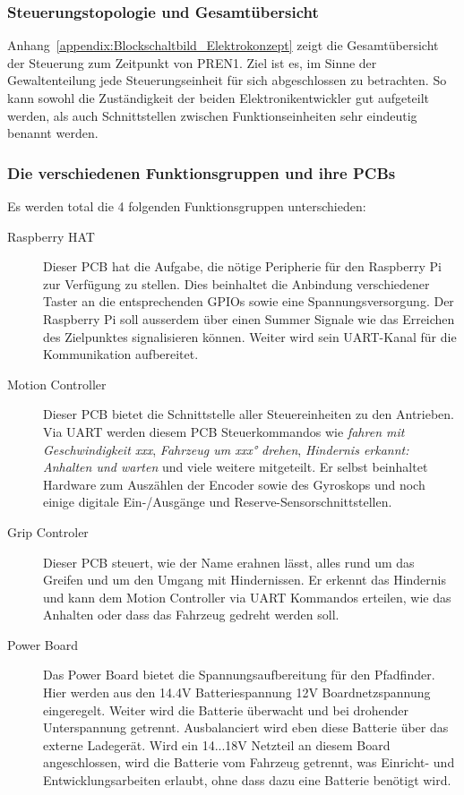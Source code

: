 \documentclass[main.tex]{subfiles} %
\begin{document}

\subsubsection{Steuerungstopologie und Gesamtübersicht}

Anhang~\ref{appendix:Blockschaltbild_Elektrokonzept} zeigt die Gesamtübersicht
der Steuerung zum Zeitpunkt von PREN1. Ziel ist es, im Sinne der
Gewaltenteilung jede Steuerungseinheit für sich abgeschlossen zu betrachten. So
kann sowohl die Zuständigkeit der beiden Elektronikentwickler gut aufgeteilt
werden, als auch Schnittstellen zwischen Funktionseinheiten sehr eindeutig
benannt werden.

\subsubsection*{Die verschiedenen Funktionsgruppen und ihre PCBs}
Es werden total die 4 folgenden Funktionsgruppen unterschieden:

\begin{description}
      \item[Raspberry HAT] Dieser PCB hat die Aufgabe, die nötige Peripherie für den
            Raspberry Pi zur Verfügung zu stellen. Dies beinhaltet die Anbindung
            verschiedener Taster an die entsprechenden GPIOs sowie eine
            Spannungsversorgung. Der Raspberry Pi soll ausserdem über einen Summer Signale
            wie das Erreichen des Zielpunktes signalisieren können. Weiter wird sein
            UART-Kanal für die Kommunikation aufbereitet.
      \item[Motion Controller] Dieser PCB bietet die Schnittstelle aller Steuereinheiten zu
            den Antrieben. Via UART werden diesem PCB Steuerkommandos wie \textit{fahren
                  mit Geschwindigkeit xxx}, \textit{Fahrzeug um xxx° drehen}, \textit{Hindernis
                  erkannt: Anhalten und warten} und viele weitere mitgeteilt. Er selbst
            beinhaltet Hardware zum Auszählen der Encoder sowie des Gyroskops und noch
            einige digitale Ein-/Ausgänge und Reserve-Sensorschnittstellen.
      \item[Grip Controler] Dieser PCB steuert, wie der Name erahnen lässt, alles rund um
            das Greifen und um den Umgang mit Hindernissen. Er erkennt das Hindernis und
            kann dem Motion Controller via UART Kommandos erteilen, wie das Anhalten oder
            dass das Fahrzeug gedreht werden soll.
      \item[Power Board] Das Power Board bietet die Spannungsaufbereitung für den
            Pfadfinder. Hier werden aus den 14.4V Batteriespannung 12V Boardnetzspannung
            eingeregelt. Weiter wird die Batterie überwacht und bei drohender Unterspannung
            getrennt. Ausbalanciert wird eben diese Batterie über das externe Ladegerät.
            Wird ein 14...18V Netzteil an diesem Board angeschlossen, wird die Batterie vom
            Fahrzeug getrennt, was Einricht- und Entwicklungsarbeiten erlaubt, ohne dass
            dazu eine Batterie benötigt wird.
\end{description}
\end{document}
